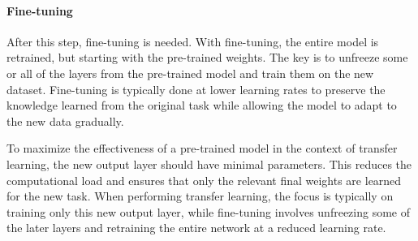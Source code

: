\paragraph*{Fine-tuning}
After this step, fine-tuning is needed. 
With fine-tuning, the entire model is retrained, but starting with the pre-trained weights. 
The key is to unfreeze some or all of the layers from the pre-trained model and train them on the new dataset. 
Fine-tuning is typically done at lower learning rates to preserve the knowledge learned from the original task while allowing the model to adapt to the new data gradually.

To maximize the effectiveness of a pre-trained model in the context of transfer learning, the new output layer should have minimal parameters. 
This reduces the computational load and ensures that only the relevant final weights are learned for the new task.
When performing transfer learning, the focus is typically on training only this new output layer, while fine-tuning involves unfreezing some of the later layers and retraining the entire network at a reduced learning rate.

